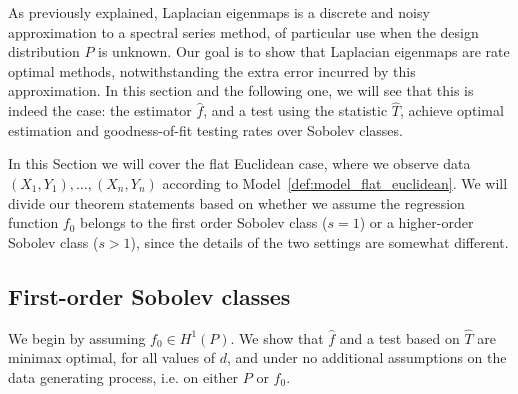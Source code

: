 \documentclass{article}
\newcommand{\1}{\mathbf{1}}
\newcommand{\wh}[1]{\widehat{#1}}
\theoremstyle{alden}
\theoremstyle{aldenthm}
\theoremstyle{definition}
\theoremstyle{remark}
\begin{document}
As previously explained, Laplacian eigenmaps is a discrete and noisy approximation to a spectral series method, of particular use when the design distribution $P$ is unknown. Our goal is to show that Laplacian eigenmaps are rate optimal methods, notwithstanding the extra error incurred by this approximation. In this section and the following one, we will see that this is indeed the case: the estimator $\wh{f}$, and a test using the statistic $\wh{T}$, achieve optimal estimation and goodness-of-fit testing rates over Sobolev classes. 

In this Section we will cover the flat Euclidean case, where we observe data $(X_1,Y_1),\ldots,(X_n,Y_n)$ according to Model~\ref{def:model_flat_euclidean}. We will divide our theorem statements based on whether we assume the regression function $f_0$ belongs to the first order Sobolev class ($s = 1$) or a higher-order Sobolev class ($s > 1$), since the details of the two settings are somewhat different.

\subsection{First-order Sobolev classes}
\label{sec:first_order_sobolev_classes}
We begin by assuming $f_0 \in H^1(P)$. We show that $\wh{f}$ and a test based on $\wh{T}$ are minimax optimal, for all values of $d$, and under no additional assumptions on the data generating process, i.e. on either $P$ or $f_0$.
\end{document}
